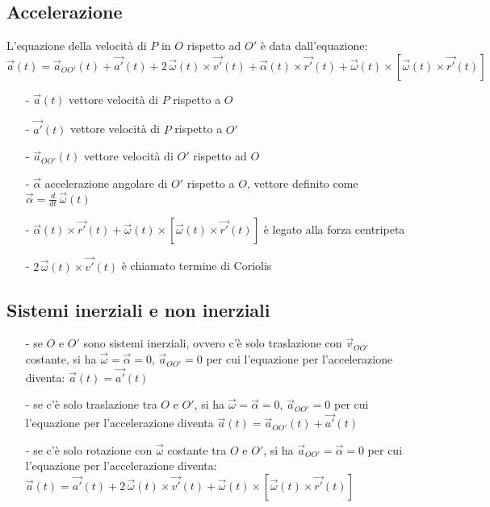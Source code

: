 \documentclass[a4paper]{article}
\newcommand\dt{\frac{d}{dt}\,}
\begin{document}
\subsection{Accelerazione}
L'equazione della velocità di \(P\) in \(O\) rispetto ad \(O'\) è data dall'equazione:
\[\vec{a}(t) = \vec{a}_{OO'}(t) + \vec{a'}(t) + 2 \, \vec{\omega}(t) \times \vec{v'}(t) + \vec{\alpha}(t) \times \vec{r'}(t) + \vec{\omega}(t) \times [\vec{\omega}(t) \times \vec{r'}(t)]\]
\begin{itemize}[topsep=3pt, itemsep=0pt]
	\item[-] \(\vec{a}(t)\) vettore velocità di \(P\) rispetto a \(O\)
	\item[-] \(\vec{a'}(t)\) vettore velocità di \(P\) rispetto a \(O'\)
	\item[-] \(\vec{a}_{OO'}(t)\) vettore velocità di \(O'\) rispetto ad \(O\)
	\item[-] \(\vec{\alpha}\) accelerazione angolare di \(O'\) rispetto a \(O\), vettore definito come \(\vec{\alpha} = \dt \vec{\omega}(t)\)
	\item[-] \(\vec{\alpha}(t) \times \vec{r'}(t) + \vec{\omega}(t) \times [\vec{\omega}(t) \times \vec{r'}(t)]\) è legato alla forza centripeta
	\item[-] \(2 \, \vec{\omega}(t) \times \vec{v'}(t)\) è chiamato termine di Coriolis
\end{itemize}

\subsection{Sistemi inerziali e non inerziali}
\begin{itemize}
	\item[-] se \(O\) e \(O'\) sono sistemi inerziali, ovvero c'è solo traslazione con \(\vec{v}_{OO'}\) costante, si ha \(\vec{\omega} = \vec{\alpha} = 0\),
	\(\vec{a}_{OO'} = 0\) per cui l'equazione per l'accelerazione diventa: \(\vec{a}(t) = \vec{a'}(t)\)
	\item[-] se c'è solo traslazione tra \(O\) e \(O'\), si ha \(\vec{\omega} = \vec{\alpha} = 0\), \(\vec{a}_{OO'} = 0\) per cui
	l'equazione per l'accelerazione diventa \(\vec{a}(t) = \vec{a}_{OO'}(t) + \vec{a'}(t)\)
	\item[-] se c'è solo rotazione con \(\vec{\omega}\) costante tra \(O\) e \(O'\), si ha \(\vec{a}_{OO'} = \vec{\alpha} = 0\)
	per cui l'equazione per l'accelerazione diventa: \(\vec{a}(t) = \vec{a'}(t) + 2 \, \vec{\omega}(t) \times \vec{v'}(t) + \vec{\omega}(t) \times [\vec{\omega}(t) \times \vec{r'}(t)]\)
\end{itemize}
\end{document}
